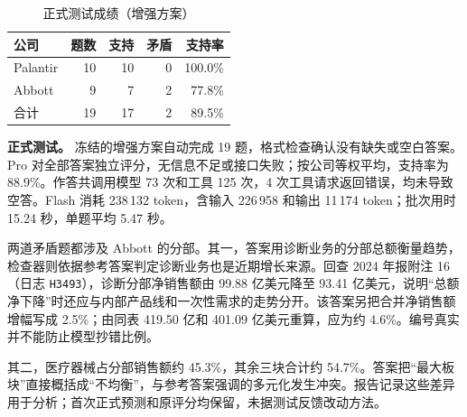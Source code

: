 
\begin{table}[ht]
\centering
\caption{正式测试成绩（增强方案）}
\label{tab:fqa-test}
\begin{tabular}{@{}lrrrr@{}}
\toprule
公司 & 题数 & 支持 & 矛盾 & 支持率\\
\midrule
Palantir & 10 & 10 & 0 & 100.0\%\\
Abbott   & 9 & 7 & 2 & 77.8\%\\
合计     & 19 & 17 & 2 & 89.5\%\\
\bottomrule
\end{tabular}
\end{table}

\textbf{正式测试。} 冻结的增强方案自动完成 19 题，格式检查确认没有缺失或空白答案。Pro 对全部答案独立评分，无信息不足或接口失败；按公司等权平均，支持率为 88.9\%。作答共调用模型 73 次和工具 125 次，4 次工具请求返回错误，均未导致空答。Flash 消耗 238\,132 token，含输入 226\,958 和输出 11\,174 token；批次用时 15.24 秒，单题平均 5.47 秒。

两道矛盾题都涉及 Abbott 的分部。其一，答案用诊断业务的分部总额衡量趋势，检查器则依据参考答案判定诊断业务也是近期增长来源。回查 2024 年报附注 16（日志 \texttt{H3493}），诊断分部净销售额由 99.88 亿美元降至 93.41 亿美元，说明“总额净下降”时还应与内部产品线和一次性需求的走势分开。该答案另把合并净销售额增幅写成 2.5\%；由同表 419.50 亿和 401.09 亿美元重算，应为约 4.6\%。编号真实并不能防止模型抄错比例。

其二，医疗器械占分部销售额约 45.3\%，其余三块合计约 54.7\%。答案把“最大板块”直接概括成“不均衡”，与参考答案强调的多元化发生冲突。报告记录这些差异用于分析；首次正式预测和原评分均保留，未据测试反馈改动方法。
